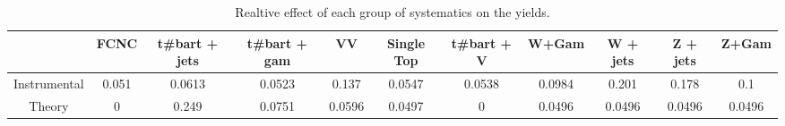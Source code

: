 \begin{table}[htbp]
\begin{center}
\begin{tabular}{|c|c|c|c|c|c|c|c|c|c|c|}
\hline 
      & FCNC      & t#bar{t} + jets      & t#bar{t} +  gam      & VV      & Single Top      & t#bar{t} + V      & W+Gam      & W + jets      & Z + jets      & Z+Gam \\ 
\hline 
 Instrumental & 0.051 & 0.0613 & 0.0523 & 0.137 & 0.0547 & 0.0538 & 0.0984 & 0.201 & 0.178 & 0.1 \\ 
 Theory & 0 & 0.249 & 0.0751 & 0.0596 & 0.0497 & 0 & 0.0496 & 0.0496 & 0.0496 & 0.0496 \\ 
\hline 
\end{tabular} 
\caption{Realtive effect of each group of systematics on the yields.} 
\end{center} 
\end{table} 
